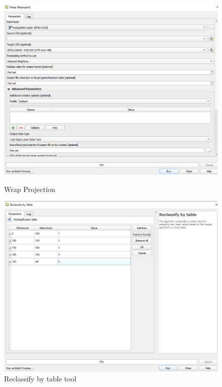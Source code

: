 \begin{figure}[hbtp]
  \centering
  \includegraphics[height=0.33\textheight]{images/gis/Warp to UTM.png}
  \caption{Wrap Projection}
  \vfill
  \includegraphics[height=0.33\textheight]{images/gis/Reclassify.png}
  \caption{Reclassify by table tool}
\end{figure}
\pagebreak

